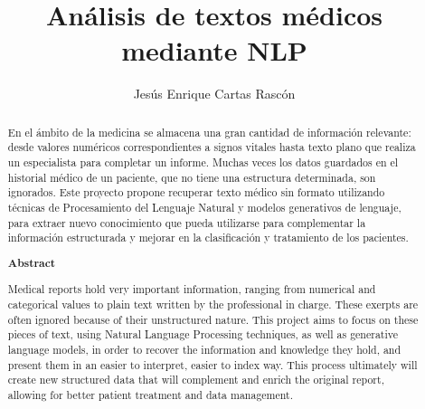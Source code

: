 \documentclass[12pt, a4paper, twoside]{report}
\title{Análisis de textos médicos \\mediante NLP}
\author{Jesús Enrique Cartas Rascón}
\begin{document}


\begin{abstract}
  En el ámbito de la medicina se almacena una gran cantidad de información relevante: desde valores numéricos correspondientes a signos vitales hasta texto plano que realiza un especialista para completar un informe. Muchas veces los datos guardados en el historial médico de un paciente, que no tiene una estructura determinada, son ignorados. Este proyecto propone recuperar texto médico sin formato utilizando técnicas de Procesamiento del Lenguaje Natural y modelos generativos de lenguaje, para extraer nuevo conocimiento que pueda utilizarse para complementar la información estructurada y mejorar en la clasificación y tratamiento de los pacientes.

\begin{center}
  \textbf{Abstract}
\end{center}


  Medical reports hold very important information, ranging from numerical and categorical values to plain text written by the professional in charge. These exerpts are often ignored because of their unstructured nature. This project aims to focus on these pieces of text, using Natural Language Processing techniques, as well as generative language models, in order to recover the information and knowledge they hold, and present them in an easier to interpret, easier to index way. This process ultimately will create new structured data that will complement and enrich the original report, allowing for better patient treatment and data management.

\end{abstract}


\tableofcontents
\listoffigures






















\end{document}
